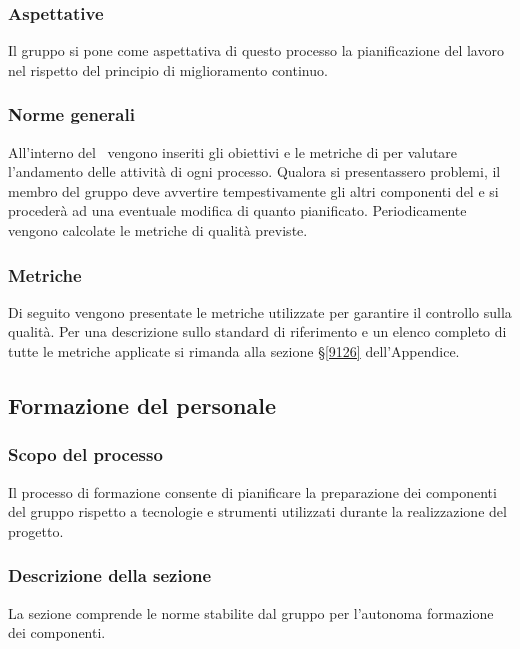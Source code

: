 \subsubsection{Aspettative}
Il gruppo si pone come aspettativa di questo processo la pianificazione del lavoro nel rispetto del principio di miglioramento continuo.
\subsubsection{Norme generali}\label{PO_NormeGenerali}
All'interno del \PdQv{}\ vengono inseriti gli obiettivi e le metriche di  per valutare l'andamento delle attività di ogni processo. Qualora si presentassero problemi, il membro del gruppo deve avvertire tempestivamente gli altri componenti del  e si procederà ad una eventuale modifica di quanto pianificato. Periodicamente vengono calcolate le metriche di qualità previste.
\subsubsection{Metriche}\label{MMiglioramento}
Di seguito vengono presentate le metriche utilizzate per garantire il controllo sulla qualità. Per una descrizione sullo standard di riferimento e un elenco completo di tutte le metriche applicate si rimanda alla sezione \S\ref{9126} dell'Appendice. 

\subsection{Formazione del personale}
\subsubsection{Scopo del processo}
Il processo di formazione consente di pianificare la preparazione dei componenti del gruppo rispetto a tecnologie e strumenti utilizzati durante la realizzazione del progetto.
\subsubsection{Descrizione della sezione}
La sezione comprende le norme stabilite dal gruppo per l'autonoma formazione dei componenti.
